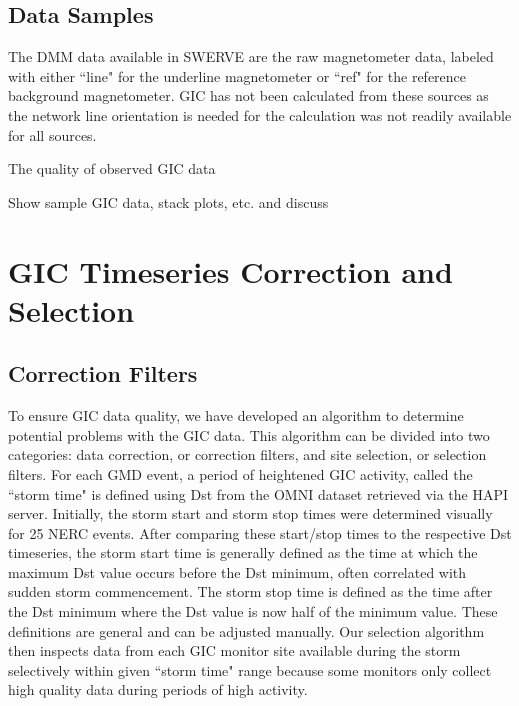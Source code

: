 \documentclass[draft]{agujournal2019}
\begin{document}
\subsection{Data Samples}

The DMM data available in SWERVE are the raw magnetometer data, labeled with either ``line" for the underline magnetometer or ``ref" for the reference background magnetometer. GIC has not been calculated from these sources as the network line orientation is needed for the calculation was not readily available for all sources.

The quality of observed GIC data

Show sample GIC data, stack plots, etc. and discuss


\section{GIC Timeseries Correction and Selection}

\subsection{Correction Filters}

To ensure GIC data quality, we have developed an algorithm to determine potential problems with the GIC data. This algorithm can be divided into two categories: data correction, or correction filters, and site selection, or selection filters.
For each GMD event, a period of heightened GIC activity, called the ``storm time" is defined using Dst from the OMNI dataset \protect\cite{OMNI2020_1hr} retrieved via the HAPI \protect\cite{Weigel2021} server. Initially, the storm start and storm stop times were determined visually for 25 NERC events. After comparing these start/stop times to the respective Dst timeseries, the storm start time is generally defined as the time at which the maximum Dst value occurs before the Dst minimum, often correlated with sudden storm commencement. The storm stop time is defined as the time after the Dst minimum where the Dst value is now half of the minimum value. These definitions are general and can be adjusted manually.
Our selection algorithm then inspects data from each GIC monitor site available during the storm selectively within given ``storm time" range because some monitors only collect high quality data during periods of high activity. 
\end{document}
